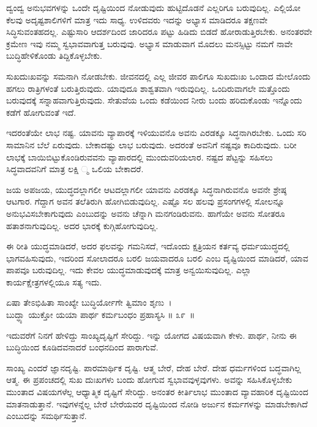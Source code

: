 ದ್ವಂದ್ವ ಅನುಭವಗಳನ್ನು ಒಂದೇ ದೃಷ್ಟಿಯಿಂದ ನೋಡುವುದು ಹುಟ್ಟಿದೊಡನೆ ಎಲ್ಲರಿಗೂ ಬರುವುದಿಲ್ಲ. ಎಲ್ಲಿಯೋ ಕೆಲವು ಅದೃಷ್ಟಶಾಲಿಗಳಿಗೆ ಮಾತ್ರ ಇದು ಸಾಧ್ಯ. ಉಳಿದವರು ಇದನ್ನು ಅಭ್ಯಾಸ ಮಾಡಿದರೂ ತಕ್ಷಣವೇ ಸಿದ್ಧಿಸುವಂತಹದಲ್ಲ. ಎಷ್ಟುಸಾರಿ ಆದರ್ಶದಿಂದ ಜಾರಿದರೂ ಪಟ್ಟು ಹಿಡಿದು ಬಿಡದೆ ಹೋರಾಡುತ್ತಿರಬೇಕು. ಅನಂತರವೇ ಕ್ರಮೇಣ ಇವು ನಮ್ಮ ಸ್ವಭಾವವಾಗುತ್ತ ಬರುವುವು. ಅಭ್ಯಾಸ ಮಾಡುವಾಗ ಮೊದಲು ಮನಸ್ಸಿಟ್ಟು ನಮಗೆ ನಾವೇ ಬುದ್ಧಿಹೇಳಿಕೊಂಡು ತಿದ್ದಿಕೊಳ್ಳಬೇಕು.

ಸುಖದುಃಖವನ್ನು ಸಮನಾಗಿ ನೋಡಬೇಕು. ಜೀವನದಲ್ಲಿ ಎಲ್ಲ ಜೀವರ ಪಾಲಿಗೂ ಸುಖದುಃಖ ಒಂದಾದ ಮೇಲೊಂದು ಹಗಲು ರಾತ್ರಿಗಳಂತೆ ಬರುತ್ತಿರುವುದು. ಯಾವುದೂ ಶಾಶ್ವತವಾಗಿ ಇರುವುದಿಲ್ಲ. ಒಂದಿರುವಾಗಲೇ ಮತ್ತೊಂದು ಬರುವುದಕ್ಕೆ ಸನ್ನಾಹವಾಗುತ್ತಿರುವುದು. ಸೇತುವೆಯ ಒಂದು ಕಡೆಯಿಂದ ನೀರು ಬಂದು ಹರಿದುಕೊಂಡು ಇನ್ನೊಂದು ಕಡೆಗೆ ಹೋಗುವಂತೆ ಇದೆ.

ಇದರಂತೆಯೇ ಲಾಭ ನಷ್ಟ. ಯಾವನು ವ್ಯಾಪಾರಕ್ಕೆ ಇಳಿಯುವನೊ ಅವನು ಎರಡಕ್ಕೂ ಸಿದ್ಧನಾಗಿರಬೇಕು. ಒಂದು ಸರಿ ಸಾಮಾನಿನ ಬೆಲೆ ಏರುವುದು. ಬೇಕಾದಷ್ಟು ಲಾಭ ಬರುವುದು. ಅದರಂತೆ ಅವನಿಗೆ ನಷ್ಟವೂ ಕಾದಿರುವುದು. ಬರೀ ಲಾಭಕ್ಕೆ ಬಾಯಿಬಿಟ್ಟುಕೊಂಡಿರುವವನು ವ್ಯಾಪಾರದಲ್ಲಿ ಮುಂದುವರಿಯಲಾರ. ನಷ್ಟದ ಪೆಟ್ಟನ್ನು ಸಹಿಸಲು ಸಿದ್ಧವಾದವನಿಗೆ ಮಾತ್ರ ಲಕ್ಷಿ ್ಮ ಒಲಿಯ ಬೇಕಾದರೆ.

ಜಯ ಅಪಜಯ, ಯುದ್ಧದಲ್ಲಾಗಲೀ ಆಟದಲ್ಲಾಗಲೀ ಯಾವನು ಎರಡಕ್ಕೂ ಸಿದ್ಧನಾಗಿರುವನೊ ಅವನೇ ಶ್ರೇಷ್ಠ ಆಟಗಾರ. ಗೆದ್ದಾಗ ಅವನ ತಲೆತಿರುಗಿ ಹೋಗಿಬಿಡುವುದಿಲ್ಲ. ಎಷ್ಟೊ ಸಲ ಹಲವು ಪ್ರಸಂಗಗಳಲ್ಲಿ ಸೋಲನ್ನೂ ಅನುಭವಿಸಬೇಕಾಗುವುದು ಎಂಬುದನ್ನು ಅವನು ಚೆನ್ನಾಗಿ ಮನಗಂಡಿರುವನು. ಹಾಗೆಯೇ ಅವನು ಸೋತರೂ ಹತಾಶನಾಗುವುದಿಲ್ಲ. ಅದರ ಭಾರಕ್ಕೆ ಕುಗ್ಗಿಹೋಗುವುದಿಲ್ಲ.

ಈ ರೀತಿ ಯುದ್ಧಮಾಡಿದರೆ, ಅದರ ಫಲವನ್ನು ಗಮನಿಸದೆ, ಇದೊಂದು ಕ್ಷತ್ರಿಯನ ಕರ್ತವ್ಯ ಧರ್ಮಯುದ್ಧದಲ್ಲಿ ಭಾಗವಹಿಸುವುದು, ಇದರಿಂದ ಸೋಲಾದರೂ ಬರಲಿ ಜಯವಾದರೂ ಬರಲಿ ಎಂಬ ದೃಷ್ಟಿಯಿಂದ ಮಾಡಿದರೆ, ಯಾವ ಪಾಪವೂ ಬರುವುದಿಲ್ಲ. ಇದು ಕೇವಲ ಯುದ್ಧಮಾಡುವುದಕ್ಕೆ ಮಾತ್ರ ಅನ್ವಯಿಸುವುದಿಲ್ಲ. ಎಲ್ಲಾ ಕಾರ್ಯಕ್ಷೇತ್ರಗಳಲ್ಲಿಯೂ ಸತ್ಯ ಇದು.

\begin{shloka}
ಏಷಾ ತೇಽಭಿಹಿತಾ ಸಾಂಖ್ಯೇ ಬುದ್ಧಿರ್ಯೋಗೇ ತ್ವಿಮಾಂ ಶೃಣು~।\\ಬುದ್ಧ್ಯಾ ಯುಕ್ತೋ ಯಯಾ ಪಾರ್ಥ ಕರ್ಮಬಂಧಂ ಪ್ರಹಾಸ್ಯಸಿ \hfill॥ ೩೯~॥
\end{shloka}

\begin{artha}
ಇದುವರೆಗೆ ನಿನಗೆ ಹೇಳಿದ್ದು ಸಾಂಖ್ಯದೃಷ್ಟಿಗೆ ಸೇರಿದ್ದು. ಇನ್ನು ಯೋಗದ ವಿಷಯವಾಗಿ ಕೇಳು. ಪಾರ್ಥ, ನೀನು ಈ ಬುದ್ಧಿಯಿಂದ ಕೂಡಿದವನಾದರೆ ಬಂಧನದಿಂದ ಪಾರಾಗುವೆ.
\end{artha}

ಸಾಂಖ್ಯ ಎಂದರೆ ಜ್ಞಾನದೃಷ್ಟಿ. ಪಾರಮಾರ್ಥಿಕ ದೃಷ್ಟಿ. ಆತ್ಮ ಬೇರೆ, ದೇಹ ಬೇರೆ. ದೇಹ ಧರ್ಮಗಳಿಂದ ಬದ್ಧವಾಗಿಲ್ಲ ಆತ್ಮ. ಈ ಪ್ರಪಂಚದಲ್ಲಿ ಸುಖ ದುಃಖಗಳು ಬಂದು ಹೋಗುವ ಸ್ವಭಾವವುಳ್ಳವುಗಳು. ಅವನ್ನು ಸಹಿಸಿಕೊಳ್ಳಬೇಕು ಮುಂತಾದ ವಿಷಯಗಳೆಲ್ಲ ಆಧ್ಯಾತ್ಮಿಕ ದೃಷ್ಟಿಗೆ ಸೇರಿದ್ದು. ಅನಂತರ ಕೀರ್ತಿಲಾಭ ಮುಂತಾದ ವ್ಯಾವಹಾರಿಕ ದೃಷ್ಟಿಯಿಂದ ಮಾತನಾಡುತ್ತಾನೆ. ಇವುಗಳನ್ನೆಲ್ಲ ಬೇರೆ ಬೇರೆಯವರ ದೃಷ್ಟಿಯಿಂದ ನೋಡಿ ಅರ್ಜುನ ಕರ್ಮಗಳನ್ನು ಮಾಡಬೇಕಾಗಿದೆ ಎಂಬುದನ್ನು ಸಮರ್ಥಿಸುತ್ತಾನೆ.

